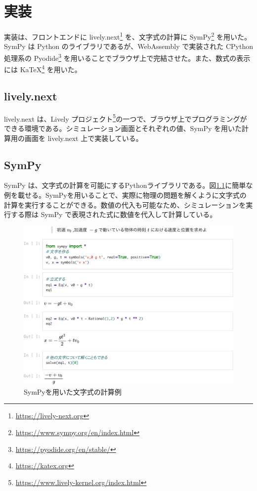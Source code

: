 \chapter{実装} \label{implementation}

実装は、フロントエンドに lively.next\footnote{\url{https://lively-next.org}} を、文字式の計算に SymPy\footnote{\url{https://www.sympy.org/en/index.html}} を用いた。SymPy は Python のライブラリであるが、WebAssembly で実装された CPython 処理系の Pyodide\footnote{\url{https://pyodide.org/en/stable/}} を用いることでブラウザ上で完結させた。また、数式の表示には KaTeX\footnote{\url{https://katex.org}} を用いた。

\section{lively.next}
lively.next は、Lively プロジェクト\footnote{\url{https://www.lively-kernel.org/index.html}}の一つで、ブラウザ上でプログラミングができる環境である。シミュレーション画面とそれぞれの値、SymPy を用いた計算用の画面を lively.next 上で実装している。

\section{SymPy}
SymPy は、文字式の計算を可能にするPythonライブラリである。図\ref{SymPy_example}に簡単な例を載せる。SymPyを用いることで、実際に物理の問題を解くように文字式の計算を実行することができる。数値の代入も可能なため、シミュレーションを実行する際は SymPy で表現された式に数値を代入して計算している。

\clearpage
\begin{figure}
\includegraphics[page=1, scale=.8]{work/SymPy_example-crop.pdf}
\caption{SymPyを用いた文字式の計算例} \label{SymPy_example}
\end{figure}
\clearpage

